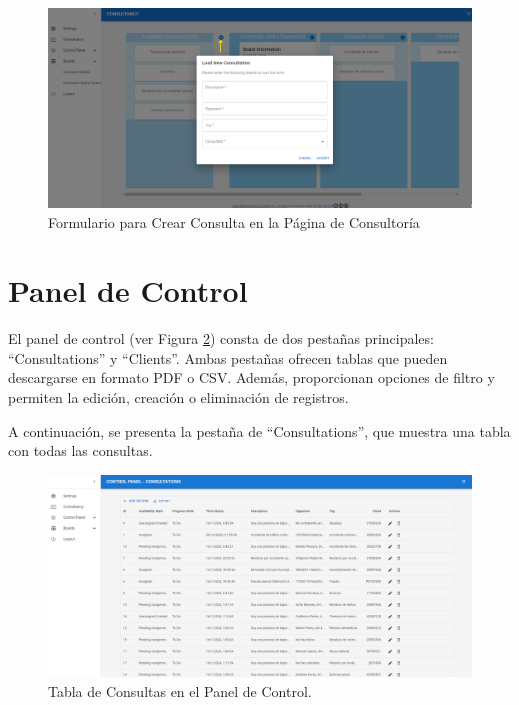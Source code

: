 \begin{figure}[H]
    \centering
    \includegraphics[width=1\linewidth]{fig/crear-consulta-consultancy.png}
    \caption{Formulario para Crear Consulta en la Página de Consultoría}
    \label{fig:formulario-crear-consulta}
\end{figure}




\section{Panel de Control}
El panel de control (ver Figura \ref{fig:consultations-table}) consta de dos pestañas principales: ``Consultations'' y ``Clients''. Ambas pestañas ofrecen tablas que pueden descargarse en formato PDF o CSV. Además, proporcionan opciones de filtro y permiten la edición, creación o eliminación de registros.

A continuación, se presenta la pestaña de ``Consultations'', que muestra una tabla con todas las consultas.

\begin{figure}[H]
    \centering
    \includegraphics[width=1\linewidth]{fig/consultation-real-page.png}
    \caption{Tabla de Consultas en el Panel de Control.}
    \label{fig:consultations-table}
\end{figure}


